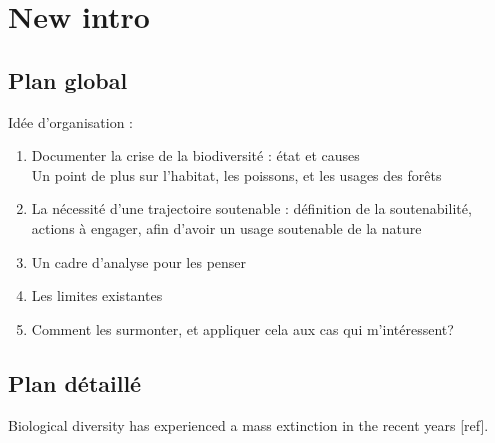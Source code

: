 \section{New intro}
\subsection{Plan global}
Idée d'organisation : 
\begin{enumerate}
\item Documenter la crise de la biodiversité : état et causes\\
Un point de plus sur l'habitat, les poissons, et les usages des forêts
\item La nécessité d'une trajectoire soutenable : définition de la soutenabilité, actions à engager, afin d'avoir un usage soutenable de la nature
\item Un cadre d'analyse pour les penser
\item Les limites existantes
\item Comment les surmonter, et appliquer cela aux cas qui m'intéressent?
\end{enumerate}
\subsection{Plan détaillé}

Biological diversity has experienced a mass extinction in the recent years [ref]. 


